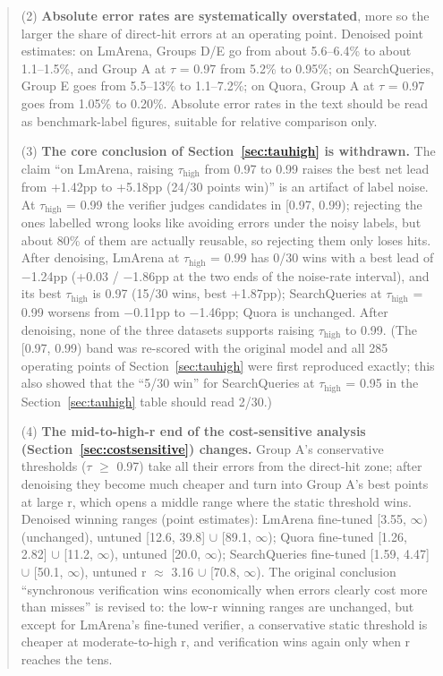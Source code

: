 \documentclass[11pt]{article}
\newcommand{\tauhigh}{\ensuremath{\tau_{\text{high}}}}
\begin{document}
\begin{quote}
\noindent (2) \textbf{Absolute error rates are systematically overstated}, more so the larger the share of direct-hit errors at an operating point. Denoised point estimates: on LmArena, Groups D/E go from about 5.6–6.4\% to about 1.1–1.5\%, and Group A at $\tau$ = 0.97 from 5.2\% to 0.95\%; on SearchQueries, Group E goes from 5.5–13\% to 1.1–7.2\%; on Quora, Group A at $\tau$ = 0.97 goes from 1.05\% to 0.20\%. Absolute error rates in the text should be read as benchmark-label figures, suitable for relative comparison only.

\noindent (3) \textbf{The core conclusion of Section~\ref{sec:tauhigh} is withdrawn.} The claim ``on LmArena, raising \tauhigh{} from 0.97 to 0.99 raises the best net lead from +1.42pp to +5.18pp (24/30 points win)'' is an artifact of label noise. At \tauhigh{} = 0.99 the verifier judges candidates in [0.97, 0.99); rejecting the ones labelled wrong looks like avoiding errors under the noisy labels, but about 80\% of them are actually reusable, so rejecting them only loses hits. After denoising, LmArena at \tauhigh{} = 0.99 has 0/30 wins with a best lead of $-$1.24pp (+0.03 / $-$1.86pp at the two ends of the noise-rate interval), and its best \tauhigh{} is 0.97 (15/30 wins, best +1.87pp); SearchQueries at \tauhigh{} = 0.99 worsens from $-$0.11pp to $-$1.46pp; Quora is unchanged. After denoising, none of the three datasets supports raising \tauhigh{} to 0.99. (The [0.97, 0.99) band was re-scored with the original model and all 285 operating points of Section~\ref{sec:tauhigh} were first reproduced exactly; this also showed that the ``5/30 win'' for SearchQueries at \tauhigh{} = 0.95 in the Section~\ref{sec:tauhigh} table should read 2/30.)

\noindent (4) \textbf{The mid-to-high-r end of the cost-sensitive analysis (Section~\ref{sec:costsensitive}) changes.} Group A's conservative thresholds ($\tau$ $\geq$ 0.97) take all their errors from the direct-hit zone; after denoising they become much cheaper and turn into Group A's best points at large r, which opens a middle range where the static threshold wins. Denoised winning ranges (point estimates): LmArena fine-tuned [3.55, $\infty$) (unchanged), untuned [12.6, 39.8] $\cup$ [89.1, $\infty$); Quora fine-tuned [1.26, 2.82] $\cup$ [11.2, $\infty$), untuned [20.0, $\infty$); SearchQueries fine-tuned [1.59, 4.47] $\cup$ [50.1, $\infty$), untuned r $\approx$ 3.16 $\cup$ [70.8, $\infty$). The original conclusion ``synchronous verification wins economically when errors clearly cost more than misses'' is revised to: the low-r winning ranges are unchanged, but except for LmArena's fine-tuned verifier, a conservative static threshold is cheaper at moderate-to-high r, and verification wins again only when r reaches the tens.


\end{quote}
\end{document}
